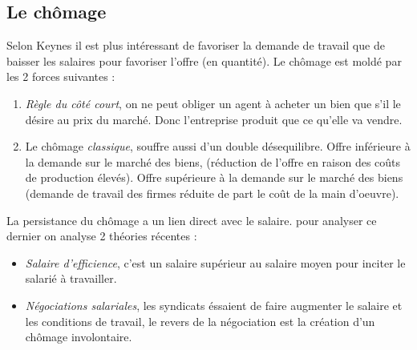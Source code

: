 \begin{tcolorbox}[title= Modèle IS-LM]
	
\end{tcolorbox}


\subsection{Le chômage} %
\label{sub:le_chomage}

Selon Keynes il est plus intéressant de favoriser la demande de travail que de baisser les salaires pour favoriser l'offre (en quantité).
Le chômage est moldé par les 2 forces suivantes : 
\begin{enumerate}
	\item \emph{Règle du côté court}, on ne peut obliger un agent à acheter un bien que s'il le désire au prix du marché. Donc l'entreprise produit que ce 
	qu'elle va vendre.
	\item Le chômage \emph{classique}, souffre aussi d'un double désequilibre. Offre inférieure à la demande sur le marché des biens, (réduction de l'offre
	en raison des coûts de production élevés). Offre supérieure à la demande sur le marché des biens (demande de travail des firmes réduite de part 
	le coût de la main d'oeuvre).
\end{enumerate}

La persistance du chômage a un lien direct avec le salaire. pour analyser ce dernier on analyse 2 théories récentes : 
\begin{itemize}
	\item \emph{Salaire d'efficience}, c'est un salaire supérieur au salaire moyen pour inciter le salarié à travailler.
	\item \emph{Négociations salariales}, les syndicats éssaient de faire augmenter le salaire et les conditions de travail, le revers de la négociation 
	est la création d'un chômage involontaire.
\end{itemize}


